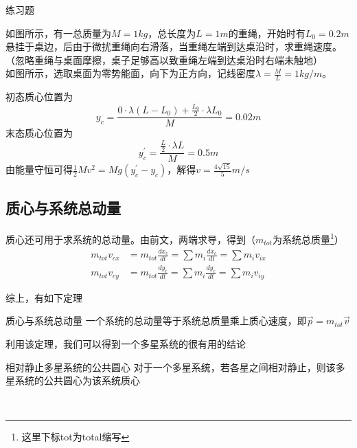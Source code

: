 \begin{ep}{练习题}{}

如图所示，有一总质量为$M=1kg$，总长度为$L=1m$的重绳，开始时有$L_0 = 0.2m$悬挂于桌边，后由于微扰重绳向右滑落，当重绳左端到达桌沿时，求重绳速度。（忽略重绳与桌面摩擦，桌子足够高以致重绳左端到达桌沿时右端未触地）
~\\

如图所示，选取桌面为零势能面，向下为正方向，记线密度$\lambda = \frac{M}{L} = 1kg/m$。

\begin{minipage}[b]{0.65\linewidth}
初态质心位置为
$$y_c = \frac{ 0 \cdot \lambda (L - L_0) + \frac{L_0}{2} \cdot \lambda L_0}{M}  = 0.02m$$
末态质心位置为
$$y_c^{\prime} = \frac{\frac{L}{2} \cdot \lambda L}{M} = 0.5m$$
由能量守恒可得$\frac{1}{2} M v^2 = Mg(y_c^{\prime}-y_c)$，解得$v = \frac{4\sqrt{15}}{5} m/s$
\end{minipage}
\hfill
\begin{minipage}[b]{0.35\linewidth}

\end{minipage}
\end{ep}

\subsection{质心与系统总动量}
质心还可用于求系统的总动量。由前文，两端求导，得到（$m_{tot}$为系统总质量\footnote{这里下标tot为total缩写}）
\begin{subequations}
\begin{align*}
m_{tot} v_{cx} &= m_{tot} \frac{d x_c}{dt} = \sum m_i \frac{d x_c}{dt} = \sum m_i v_{ix} \\
m_{tot} v_{cy} &= m_{tot} \frac{d y_c}{dt} = \sum m_i \frac{d y_c}{dt} = \sum m_i v_{iy}  
\end{align*}
\end{subequations}

综上，有如下定理

\begin{theo}[label=zxyxtzdl]{质心与系统总动量}{}
一个系统的总动量等于系统总质量乘上质心速度，即$\vec{p} = m_{tot} \vec{v}$
\end{theo}

利用该定理，我们可以得到一个多星系统的很有用的结论
~\\

\begin{minipage}[b]{0.3\linewidth}

\end{minipage}
\hfill
\begin{minipage}[b]{0.5\linewidth}
\begin{theo}{相对静止多星系统的公共圆心}{}
对于一个多星系统，若各星之间相对静止，则该多星系统的公共圆心为该系统质心
\end{theo}
\end{minipage}
~\\

